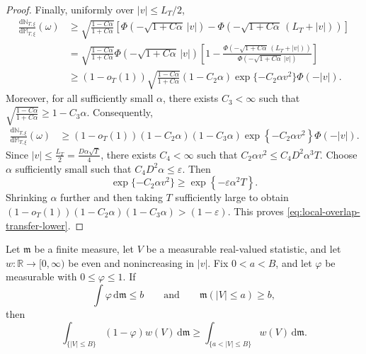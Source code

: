 \documentclass[10pt]{article}
\newcommand{\dd}{\mathrm{d}}
\theoremstyle{plain}
\begin{document}
\begin{proof}
Finally, uniformly over $|v|\le L_T/2$,
\[
\begin{aligned}
    \frac{\dd\mathbb N_{T,\xi}}
         {\dd\mathbb M_{T,\xi}}(\omega)
    &\ge
    \sqrt{
        \frac{1-C\alpha}{1+C\alpha}
    }
    \left[
        \Phi\left(
            -\sqrt{1+C\alpha}\,|v|
        \right)
        -
        \Phi\left(
            -\sqrt{1+C\alpha}\,(L_T+|v|)
        \right)
    \right] \\
    &= \sqrt{
        \frac{1-C\alpha}{1+C\alpha}
    } \Phi\left(
            -\sqrt{1+C\alpha}\,|v|
        \right) \left[ 1 - \frac{\Phi\left(
            -\sqrt{1+C\alpha}\,(L_T+|v|)
        \right)}{\Phi\left(
            -\sqrt{1+C\alpha}\,|v|
        \right)}\right] \\
    &\geq \left( 1- o_T(1) \right) 
    \sqrt{
        \frac{1-C\alpha}{1+C\alpha}
    }
    (1-C_2\alpha)
    \exp\{-C_2\alpha v^2\}
    \Phi(-|v|).
\end{aligned}
\]
Moreover, for all sufficiently small $\alpha$, there exists
$C_3<\infty$ such that
    $\sqrt{\frac{1-C\alpha}{1+C\alpha}}
    \ge
    1-C_3\alpha$.
Consequently,
\[
\begin{aligned}
    \frac{\dd\mathbb N_{T,\xi}}
         {\dd\mathbb M_{T,\xi}}(\omega)
    &\ge
    (1-o_T(1))
    (1-C_2\alpha)(1-C_3\alpha)
    \exp\left\{
        -C_2\alpha v^2
    \right\}
    \Phi\left(
        -|v|
    \right).
\end{aligned}
\]
Since
    $|v|
    \le
    \frac{L_T}{2}
    =
    \frac{D\alpha\sqrt T}{4}$,
there exists $C_4<\infty$ such that
    $C_2\alpha v^2
    \le
    C_4D^2\alpha^3T$.
Choose $\alpha$ sufficiently small such that
    $C_4D^2\alpha
    \le
    \varepsilon$.
Then
\[
    \exp\{
        -C_2\alpha v^2
    \}
    \ge
    \exp\left\{
        -\varepsilon\alpha^2T
    \right\}.
\]
Shrinking $\alpha$ further and then taking $T$ sufficiently large to obtain $(1-o_T(1))
    (1-C_2\alpha)(1-C_3\alpha)>(1-\varepsilon)$. This proves
\eqref{eq:local-overlap-transfer-lower}. 
\end{proof}








\begin{lemma}
\label{lem:bathtub-general-measure-transfer-lower}
Let $\mathfrak m$ be a finite measure, let $V$ be a measurable real-valued
statistic, and let $w:\mathbb R\to[0,\infty)$ be even and nonincreasing in
$|v|$. Fix $0<a<B$, and let $\varphi$ be measurable with
$0\le\varphi\le1$. If
\[
    \int\varphi\,\dd\mathfrak m
    \le
    b
    \qquad\text{and}\qquad
    \mathfrak m(|V|\le a)
    \ge
    b,
\]
then
\begin{equation}
\label{eq:bathtub-general-measure-transfer-lower}
    \int_{\{|V|\le B\}}
        (1-\varphi)w(V)
    \,\dd\mathfrak m
    \ge
    \int_{\{a<|V|\le B\}}
        w(V)
    \,\dd\mathfrak m.
\end{equation}
\end{lemma}
\end{document}
